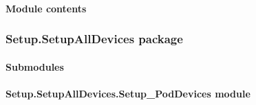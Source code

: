 \documentclass[letterpaper,10pt,english]{sphinxmanual}
\begin{document}
\paragraph{Module contents}
\label{\detokenize{Setup.Inputs:module-Setup.Inputs}}\label{\detokenize{Setup.Inputs:module-contents}}
\sphinxstepscope


\subsubsection{Setup.SetupAllDevices package}
\label{\detokenize{Setup.SetupAllDevices:setup-setupalldevices-package}}\label{\detokenize{Setup.SetupAllDevices::doc}}

\paragraph{Submodules}
\label{\detokenize{Setup.SetupAllDevices:submodules}}

\paragraph{Setup.SetupAllDevices.Setup\_PodDevices module}
\label{\detokenize{Setup.SetupAllDevices:module-Setup.SetupAllDevices.Setup_PodDevices}}\label{\detokenize{Setup.SetupAllDevices:setup-setupalldevices-setup-poddevices-module}}
\end{document}
